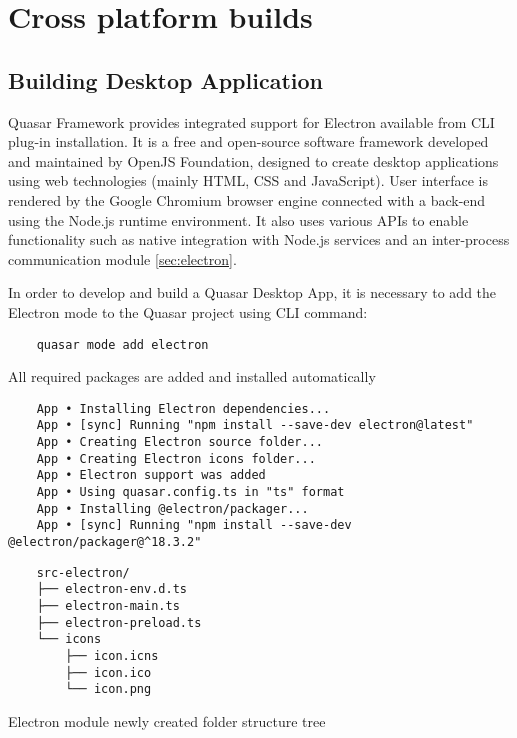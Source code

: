 \chapter{{Cross platform builds}}%
\label{ch:deploy}

\section{{Building Desktop Application}}%
\label{sec:desktop}

Quasar Framework provides integrated support for Electron available from CLI plug-in installation. It is a free and open-source software framework developed and maintained by OpenJS Foundation, designed to create desktop applications using web technologies (mainly HTML, CSS and JavaScript).  User interface is rendered by the Google Chromium browser engine connected with a back-end using the Node.js runtime environment. It also uses various APIs to enable functionality such as native integration with Node.js services and an inter-process communication module \ref{sec:electron}.

In order to develop and build a Quasar Desktop App, it is necessary to add the Electron mode to the Quasar project using CLI command:
\begin{verbatim}
    quasar mode add electron
\end{verbatim}
All required packages are added and installed automatically

\begin{verbatim}
    App • Installing Electron dependencies...
    App • [sync] Running "npm install --save-dev electron@latest"
    App • Creating Electron source folder...
    App • Creating Electron icons folder...
    App • Electron support was added
    App • Using quasar.config.ts in "ts" format
    App • Installing @electron/packager...
    App • [sync] Running "npm install --save-dev @electron/packager@^18.3.2"
\end{verbatim}


\begin{listing}[H]
    \begin{verbatim}
    src-electron/
    ├── electron-env.d.ts
    ├── electron-main.ts
    ├── electron-preload.ts
    └── icons
        ├── icon.icns
        ├── icon.ico
        └── icon.png
    \end{verbatim}
\caption[Electron module folder structure tree]{Electron module newly created folder structure tree}
\end{listing}

